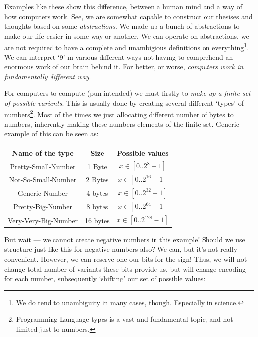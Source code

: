 \documentclass{article}
\begin{document}
            Examples like these show this difference, between a human mind and a way of how computers work. See, we are somewhat capable to construct our thesises and thoughts
            based on some \emph{abstractions}. We made up a bunch of abstractions to make our life easier in some way or another. We can operate on abstractions, we are not required
            to have a complete and unambigious definitions on everything\footnote{We do tend to unambiguity in many cases, though. Especially in science.}. We can interpret `9' in various
            different ways not having to comprehend an enormous work of our brain behind it. For better, or worse, \emph{computers work in fundamentally different way}.
            
            For computers to compute (pun intended) we must firstly to \emph{make up a finite set of possible variants}. This is usually done by creating several different
            `types' of numbers\footnote{Programming Language types is a vast and fundamental topic, and not limited just to numbers.}. Most of the times we just allocating 
            different number of bytes to numbers, inherently making these numbers elements of the finite set. Generic example of this can be seen as:
            
            \begin{longtable}{|c|c|c|}
                \hline
                Name of the type & Size & Possible values \\\hline
                Pretty-Small-Number & 1 Byte & $x \in [0..2^8 - 1]$ \\\hline
                Not-So-Small-Number & 2 Bytes & $x \in [0..2^{16} - 1]$\\\hline
                Generic-Number & 4 bytes & $x \in [0..2^{32} - 1]$\\\hline
                Pretty-Big-Number & 8 bytes & $x \in [0..2^{64} - 1]$\\\hline
                Very-Very-Big-Number & 16 bytes & $x \in [0..2^{128} - 1]$\\\hline
            \end{longtable}

            But wait --- we cannot create negative numbers in this example! Should we use structure just like this for negative numbers also? We can, but it's not really convenient.
            However, we can reserve one our bits for the sign! Thus, we will not change total number of variants these bits provide us, but will change encoding for each number, subsequently
            `shifting' our set of possible values:
\end{document}
